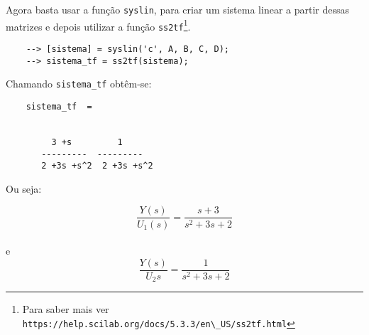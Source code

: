 Agora basta usar a função \verb|syslin|, para criar um sistema linear a partir dessas matrizes e depois utilizar a função \verb|ss2tf|\footnote{Para saber mais ver \verb|https://help.scilab.org/docs/5.3.3/en\_US/ss2tf.html|}.

\begin{verbatim}
    --> [sistema] = syslin('c', A, B, C, D);
    --> sistema_tf = ss2tf(sistema);
\end{verbatim}

Chamando \verb|sistema_tf| obtêm-se:

\begin{verbatim}
    sistema_tf  = 

                         
         3 +s         1      
       ---------  ---------  
       2 +3s +s^2  2 +3s +s^2
\end{verbatim}  

\newpage

Ou seja:

$$\frac{Y(s)}{U_{1}(s)} = \frac{s+3}{s^{2}+3s+2}$$
\\
e
\\
$$\frac{Y(s)}{U_2{s}} = \frac{1}{s^{2}+3s+2}$$
